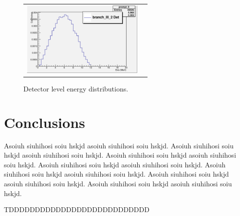 \documentclass{JINST}
\begin{document}
\begin{figure}[htp]
\begin{tabular}{cc}
    \includegraphics[width=60mm]{MC_Li_22.eps}\\
   
  \end{tabular}
\label{figur2}\caption{ Detector level energy distributions.}
\end{figure}




\section{Conclusions}
\label{section3}
Asoiuh siuhihosi soiu hskjd asoiuh siuhihosi soiu hskjd.  Asoiuh
siuhihosi soiu hskjd asoiuh siuhihosi soiu hskjd. Asoiuh siuhihosi
soiu hskjd asoiuh siuhihosi soiu hskjd. Asoiuh siuhihosi soiu hskjd
asoiuh siuhihosi soiu hskjd. Asoiuh siuhihosi soiu hskjd asoiuh
siuhihosi soiu hskjd. Asoiuh siuhihosi soiu hskjd asoiuh siuhihosi
soiu hskjd. Asoiuh siuhihosi soiu hskjd asoiuh siuhihosi soiu hskjd.


\acknowledgments

        TDDDDDDDDDDDDDDDDDDDDDDDDDDD


{}

\end{document}
